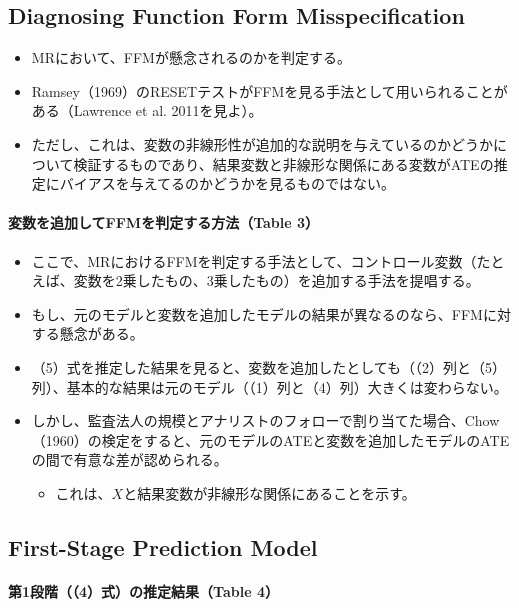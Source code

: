 \subsection*{Diagnosing Function Form Misspecification}
\begin{itemize}
 \item MRにおいて、FFMが懸念されるのかを判定する。
 \item Ramsey（1969）のRESETテストがFFMを見る手法として用いられることがある（Lawrence et al. 2011を見よ）。
 \item ただし、これは、変数の非線形性が追加的な説明を与えているのかどうかについて検証するものであり、結果変数と非線形な関係にある変数がATEの推定にバイアスを与えてるのかどうかを見るものではない。
\end{itemize}

\paragraph{変数を追加してFFMを判定する方法（Table 3）}

\begin{itemize}
 \item ここで、MRにおけるFFMを判定する手法として、コントロール変数（たとえば、変数を2乗したもの、3乗したもの）を追加する手法を提唱する。
 \item もし、元のモデルと変数を追加したモデルの結果が異なるのなら、FFMに対する懸念がある。
 \item （5）式を推定した結果を見ると、変数を追加したとしても（（2）列と（5）列）、基本的な結果は元のモデル（（1）列と（4）列）大きくは変わらない。
 \item しかし、監査法人の規模とアナリストのフォローで割り当てた場合、Chow（1960）の検定をすると、元のモデルのATEと変数を追加したモデルのATEの間で有意な差が認められる。
  \begin{itemize}
   \item これは、$X$と結果変数が非線形な関係にあることを示す。
  \end{itemize}
\end{itemize}

\subsection*{First-Stage Prediction Model}

\paragraph{第1段階（（4）式）の推定結果（Table 4）}

